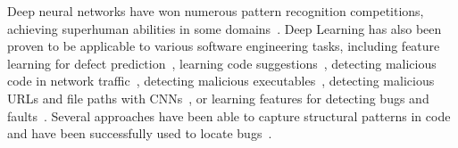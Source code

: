 \documentclass[
a4paper,
pagesize,
pdftex,
12pt,
twoside, %
BCOR=5mm, %
ngerman,
fleqn,
final,
]{scrartcl}
\begin{document}
	Deep neural networks have won numerous pattern recognition competitions, achieving superhuman abilities in some domains~\cite{Schmidhuber.2015}. Deep Learning has also been proven to be applicable to various software engineering tasks, including feature learning for defect prediction~\cite{Wang.2016}, learning code suggestions~\cite{Bhoopchand.2016}, detecting malicious code in network traffic~\cite{Elovici.2007}, detecting malicious executables~\cite{Schultz.2000}, detecting malicious URLs and file paths with CNNs~\cite{Saxe.2017}, or learning features for detecting bugs and faults~\cite{Huo.2016,Gupta.2017b}. Several approaches have been able to capture structural patterns in code~\cite{Dam.2016} and have been successfully used to locate bugs~\cite{Huo.2016,Russell.2018}.\\
	
\end{document}
